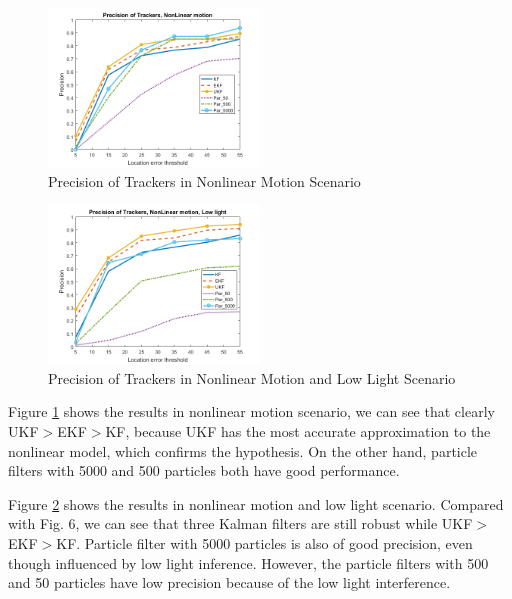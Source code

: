 \documentclass[10pt,twocolumn,letterpaper]{article}
\begin{document}
\begin{figure}[h]
     \centering
       \includegraphics[width=0.5\textwidth]{Nonlinear.png}
        \caption{\small{Precision of Trackers in Nonlinear Motion Scenario}}
        \label{fig: nonlinear}
 \end{figure}
 
\begin{figure}[h]
     \centering
       \includegraphics[width=0.5\textwidth]{Nonlinear_Low_light.png}
        \caption{\small{Precision of Trackers in Nonlinear Motion and Low Light Scenario}}
        \label{fig: nonlinear low light}
 \end{figure}
 
Figure \ref{fig: nonlinear} shows the results in nonlinear motion scenario, we can see that clearly UKF$>$EKF$>$KF, because UKF has the most accurate approximation to the nonlinear model, which confirms the hypothesis. On the other hand, particle filters with 5000 and 500 particles both have good performance.

Figure \ref{fig: nonlinear low light} shows the results in nonlinear motion and low light scenario. Compared with Fig. 6, we can see that three Kalman filters are still robust while UKF$>$EKF$>$KF. Particle filter with 5000 particles is also of good precision, even though influenced by low light inference. However, the particle filters with 500 and 50 particles have low precision because of the low light interference.
\end{document}
